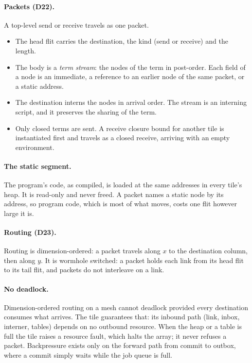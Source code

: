 \documentclass[10.5pt,a4paper]{extarticle}
\newcommand{\dec}[1]{\textbf{D#1}}
\theoremstyle{definition}
\theoremstyle{remark}
\begin{document}
\paragraph{Packets (\dec{22}).} A top-level send or receive travels as one
packet.
\begin{itemize}
\item The head flit carries the destination, the kind (send or receive) and
the length.
\item The body is a \emph{term stream}: the nodes of the term in post-order.
Each field of a node is an immediate, a reference to an earlier node of the
same packet, or a static address.
\item The destination interns the nodes in arrival order. The stream is an
interning script, and it preserves the sharing of the term.
\item Only closed terms are sent. A receive closure bound for another tile is
instantiated first and travels as a closed receive, arriving with an empty
environment.
\end{itemize}

\paragraph{The static segment.} The program's code, as compiled, is loaded at
the same addresses in every tile's heap. It is read-only and never freed. A
packet names a static node by its address, so program code, which is most of
what moves, costs one flit however large it is.

\paragraph{Routing (\dec{23}).} Routing is dimension-ordered: a packet
travels along $x$ to the destination column, then along $y$. It is wormhole
switched: a packet holds each link from its head flit to its tail flit, and
packets do not interleave on a link.

\paragraph{No deadlock.} Dimension-ordered routing on a mesh cannot deadlock
provided every destination consumes what arrives. The tile guarantees that:
its inbound path (link, inbox, interner, tables) depends on no outbound
resource. When the heap or a table is full the tile raises a resource fault,
which halts the array; it never refuses a packet. Backpressure exists only on
the forward path from commit to outbox, where a commit simply waits while the
job queue is full.
\end{document}
